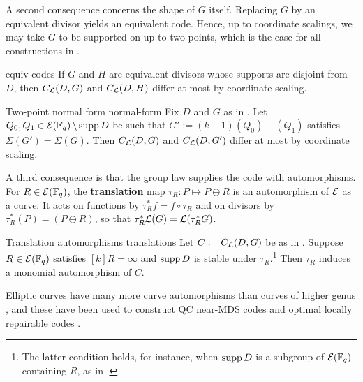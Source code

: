 \documentclass[twocolumn, 11pt]{scrartcl}
\begin{document}
A second consequence concerns the shape of $G$ itself. Replacing $G$ by an equivalent divisor yields an equivalent code. Hence, up to coordinate scalings, we may take $G$ to be supported on up to two points, which is the case for all constructions in .

\begin{lemma}{\cite[Prop.~2.2.14]{stichtenoth2009algebraic}}{equiv-codes}
    If $G$ and $H$ are equivalent divisors whose supports are disjoint from $D$, then $C_\mathcal{L}(D,G)$ and $C_\mathcal{L}(D,H)$ differ at most by coordinate scaling.
\end{lemma}

\begin{corollary}{Two-point normal form \cite{wang2025nonrs,zhu2026isodual}}{normal-form}
    Fix $D$ and $G$ as in . Let $Q_0,Q_1\in\mathcal{E}(\mathbb{F}_q)\operatorname{\setminus}\operatorname{supp} D$ be such that $G':=(k-1)(Q_0)+(Q_1)$ satisfies $\Sigma(G')=\Sigma(G)$. Then $C_\mathcal{L}(D,G)$ and $C_\mathcal{L}(D,G')$ differ at most by coordinate scaling.
\end{corollary}

A third consequence is that the group law supplies the code with automorphisms. For $R\in\mathcal{E}(\mathbb{F}_q)$, the \textbf{translation} map $\tau_R:P\mapsto P\oplus R$ is an automorphism of $\mathcal{E}$ as a curve. It acts on functions by $\tau_R^*f=f\circ\tau_R$ and on divisors by $\tau_R^*(P)=(P\ominus R)$, so that $\tau_R^*\mathcal{L}(G)=\mathcal{L}(\tau_R^*G)$.

\begin{theorem}{Translation automorphisms \cite{ma2023automorphism}}{translations}
    Let $C:=C_\mathcal{L}(D,G)$ be as in . Suppose $R\in\mathcal{E}(\mathbb{F}_q)$ satisfies $[k]R=\infty$ and $\operatorname{supp} D$ is stable under $\tau_R$.\footnote{The latter condition holds, for instance, when $\operatorname{supp} D$ is a subgroup of $\mathcal{E}(\mathbb{F}_q)$ containing $R$, as in .} Then $\tau_R$ induces a monomial automorphism of $C$.
\end{theorem}

Elliptic curves have many more curve automorphisms than curves of higher genus \cite{ma2023automorphism,stichtenoth1973automorphism}, and these have been used to construct QC near-MDS codes \cite{tong2013quasicyclic} and optimal locally repairable codes \cite{ma2023automorphism}.

\end{document}
